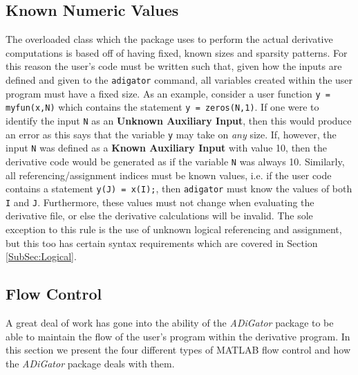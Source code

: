 \documentclass[10pt,pdftex]{article}
\begin{document}
\subsection{Known Numeric Values}\label{SubSec:Numeric}
The overloaded class which the package uses to perform the actual derivative computations is based off of having fixed, known sizes and sparsity patterns. For this reason the user's code must be written such that, given how the inputs are defined and given to the \texttt{adigator} command, all variables created within the user program must have a fixed size. As an example, consider a user function \texttt{y = myfun(x,N)} which contains the statement \texttt{y = zeros(N,1)}. If one were to identify the input \texttt{N} as an {\bf Unknown Auxiliary Input}, then this would produce an error as this says that the variable \texttt{y} may take on \emph{any} size. If, however, the input \texttt{N} was defined as a {\bf Known Auxiliary Input} with value 10, then the derivative code would be generated as if the variable \texttt{N} was always 10. Similarly, all referencing/assignment indices must be known values, i.e. if the user code contains a statement \texttt{y(J) = x(I);}, then \texttt{adigator} must know the values of both \texttt{I} and \texttt{J}. Furthermore, these values must not change when evaluating the derivative file, or else the derivative calculations will be invalid. The sole exception to this rule is the use of unknown logical referencing and assignment, but this too has certain syntax requirements which are covered in Section \ref{SubSec:Logical}.

\subsection{Flow Control}
A great deal of work has gone into the ability of the \emph{ADiGator} package to be able to maintain the flow of the user's program within the derivative program. In this section we present the four different types of MATLAB flow control and how the \emph{ADiGator} package deals with them.
\end{document}
